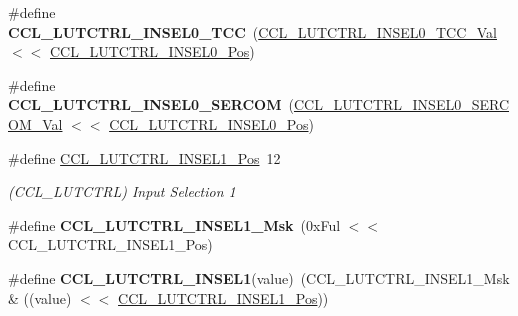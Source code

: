 \begin{DoxyCompactItemize}
\item 
\hypertarget{group___s_a_m_l21___c_c_l_gadc07eef6db5ae49294dde298a1270c71}{}\#define {\bfseries C\+C\+L\+\_\+\+L\+U\+T\+C\+T\+R\+L\+\_\+\+I\+N\+S\+E\+L0\+\_\+\+T\+C\+C}~(\hyperlink{group___s_a_m_l21___c_c_l_ga39755754ab8b792d03a3cf330e481fa1}{C\+C\+L\+\_\+\+L\+U\+T\+C\+T\+R\+L\+\_\+\+I\+N\+S\+E\+L0\+\_\+\+T\+C\+C\+\_\+\+Val}    $<$$<$ \hyperlink{group___s_a_m_l21___c_c_l_gae20b08aa5e8fcd9eb3a1a118441de53d}{C\+C\+L\+\_\+\+L\+U\+T\+C\+T\+R\+L\+\_\+\+I\+N\+S\+E\+L0\+\_\+\+Pos})\label{group___s_a_m_l21___c_c_l_gadc07eef6db5ae49294dde298a1270c71}

\item 
\hypertarget{group___s_a_m_l21___c_c_l_ga0703f259e90bac9a08cbf2d235dc8bb9}{}\#define {\bfseries C\+C\+L\+\_\+\+L\+U\+T\+C\+T\+R\+L\+\_\+\+I\+N\+S\+E\+L0\+\_\+\+S\+E\+R\+C\+O\+M}~(\hyperlink{group___s_a_m_l21___c_c_l_gad84a8d935132f431e16dbf5b25e6dac9}{C\+C\+L\+\_\+\+L\+U\+T\+C\+T\+R\+L\+\_\+\+I\+N\+S\+E\+L0\+\_\+\+S\+E\+R\+C\+O\+M\+\_\+\+Val} $<$$<$ \hyperlink{group___s_a_m_l21___c_c_l_gae20b08aa5e8fcd9eb3a1a118441de53d}{C\+C\+L\+\_\+\+L\+U\+T\+C\+T\+R\+L\+\_\+\+I\+N\+S\+E\+L0\+\_\+\+Pos})\label{group___s_a_m_l21___c_c_l_ga0703f259e90bac9a08cbf2d235dc8bb9}

\item 
\hypertarget{group___s_a_m_l21___c_c_l_gadbf5f5876e5d60c375384b2c3eea6c88}{}\#define \hyperlink{group___s_a_m_l21___c_c_l_gadbf5f5876e5d60c375384b2c3eea6c88}{C\+C\+L\+\_\+\+L\+U\+T\+C\+T\+R\+L\+\_\+\+I\+N\+S\+E\+L1\+\_\+\+Pos}~12\label{group___s_a_m_l21___c_c_l_gadbf5f5876e5d60c375384b2c3eea6c88}

\begin{DoxyCompactList}\small\item\em (C\+C\+L\+\_\+\+L\+U\+T\+C\+T\+R\+L) Input Selection 1 \end{DoxyCompactList}\item 
\hypertarget{group___s_a_m_l21___c_c_l_gae4b8da4d3fd404fb859e7df823bc52fd}{}\#define {\bfseries C\+C\+L\+\_\+\+L\+U\+T\+C\+T\+R\+L\+\_\+\+I\+N\+S\+E\+L1\+\_\+\+Msk}~(0x\+Ful $<$$<$ C\+C\+L\+\_\+\+L\+U\+T\+C\+T\+R\+L\+\_\+\+I\+N\+S\+E\+L1\+\_\+\+Pos)\label{group___s_a_m_l21___c_c_l_gae4b8da4d3fd404fb859e7df823bc52fd}

\item 
\hypertarget{group___s_a_m_l21___c_c_l_ga49423c60fb4ab4592232fa27388f48ea}{}\#define {\bfseries C\+C\+L\+\_\+\+L\+U\+T\+C\+T\+R\+L\+\_\+\+I\+N\+S\+E\+L1}(value)~(C\+C\+L\+\_\+\+L\+U\+T\+C\+T\+R\+L\+\_\+\+I\+N\+S\+E\+L1\+\_\+\+Msk \& ((value) $<$$<$ \hyperlink{group___s_a_m_l21___c_c_l_gadbf5f5876e5d60c375384b2c3eea6c88}{C\+C\+L\+\_\+\+L\+U\+T\+C\+T\+R\+L\+\_\+\+I\+N\+S\+E\+L1\+\_\+\+Pos}))\label{group___s_a_m_l21___c_c_l_ga49423c60fb4ab4592232fa27388f48ea}


\end{DoxyCompactItemize}
